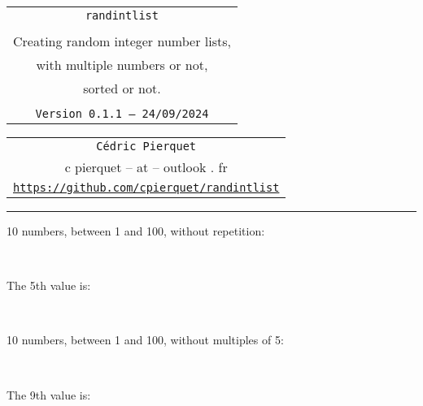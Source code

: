 \documentclass[11pt,a4paper]{ltxdoc}
\def\TPversion{0.1.1}
\def\TPdate{24/09/2024}
\begin{document}
\thispagestyle{empty}

\begin{center}
	\begin{minipage}{0.88\linewidth}
		\begin{tcolorbox}[colframe=yellow,colback=yellow!15]
			\begin{center}
				\renewcommand{\arraystretch}{1.25}%
				\begin{tabular}{c}
					{\Huge \texttt{randintlist}}\\
					\\
					{\LARGE Creating random integer number lists,} \\
					{\LARGE with multiple numbers or not,} \\
					{\LARGE sorted or not.} \\
					\\
					{\small \texttt{Version \TPversion{} -- \TPdate}}
				\end{tabular}
			\end{center}
		\end{tcolorbox}
	\end{minipage}
\end{center}

\begin{center}
	\begin{tabular}{c}
		\texttt{Cédric Pierquet}\\
		{\ttfamily c pierquet -- at -- outlook . fr}\\
		\texttt{\url{https://github.com/cpierquet/randintlist}} \\
	\end{tabular}
\end{center}

\hrule

\vfill

\begin{tcolorbox}[colframe=lightgray,colback=lightgray!5]
10 numbers, between 1 and 100, without repetition:

\hfill\randintlist[min=1,max=100,nb=10]{\mylist}\textcolor{red}{\mylist}\hfill~

The 5th value is:

\hfill\textcolor{blue}{}\hfill~
\end{tcolorbox}

\begin{tcolorbox}[colframe=lightgray,colback=lightgray!5]
10 numbers, between 1 and 100, without multiples of 5:

\hfill\randintlist[min=1,max=100,nb=10,exclude={5,10,15,20,25,30,35,40,45,50,55,60,65,70,75,80,85,90,95,100}]{\mylist}\textcolor{olive}{\mylist}\hfill~

The 9th value is:

\hfill\textcolor{purple}{}\hfill~
\end{tcolorbox}
\end{document}

